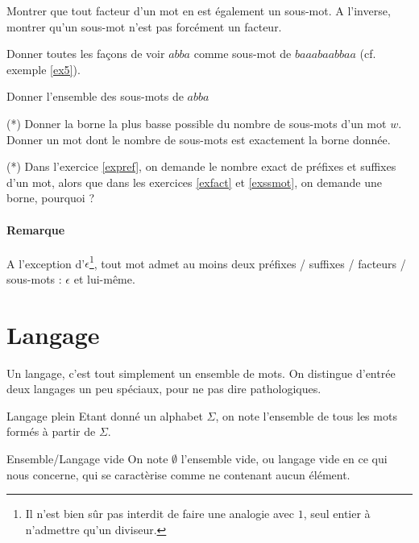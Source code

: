\begin{exercice}
Montrer que tout facteur d'un mot en est également un sous-mot. A l'inverse, montrer qu'un sous-mot n'est pas forcément un facteur. 
\end{exercice}

\begin{exercice}
Donner toutes les façons de voir $abba$ comme sous-mot de $baaabaabbaa$ (cf. exemple \ref{ex5}).
\end{exercice}

\begin{exercice}
Donner l'ensemble des sous-mots de $abba$
\end{exercice}

\begin{exercice}\label{exssmot} (*)
Donner la borne la plus basse possible du nombre de sous-mots d'un mot $w$. Donner un mot dont le nombre de sous-mots est exactement la borne donnée.
\end{exercice}

\begin{exercice} (*) Dans l'exercice \ref{expref}, on demande le nombre exact de préfixes et suffixes d'un mot, alors que dans les exercices \ref{exfact} et \ref{exssmot}, on demande une borne, pourquoi ?

\end{exercice}

\paragraph{Remarque} A l'exception d'$\epsilon$\footnote{Il n'est bien sûr pas interdit de faire une analogie avec $1$, seul entier à n'admettre qu'un diviseur.}, tout mot admet au moins deux préfixes / suffixes / facteurs / sous-mots : $\epsilon$ et lui-même. 


\section{Langage}


Un langage, c'est tout simplement un ensemble de mots. On distingue d'entrée deux langages un peu spéciaux, pour ne pas dire pathologiques.

\begin{definition}{Langage plein}{}
Etant donné un alphabet $\Sigma$, on note \mathbf{$\Sigma^*$} l'ensemble de tous les mots formés à partir de $\Sigma$.
\end{definition}


\begin{definition}{Ensemble/Langage vide}{}
On note $\emptyset$ l'ensemble vide, ou langage vide en ce qui nous concerne, qui se caractèrise comme ne contenant aucun élément.
\end{definition}

